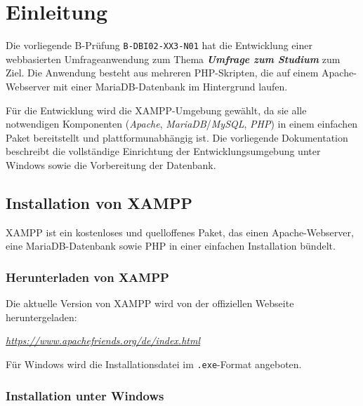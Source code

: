 
\chapter{Einleitung}
\label{chap:einleitung}
\thispagestyle{fancy}

Die vorliegende B-Prüfung \texttt{B-DBI02-XX3-N01} hat die Entwicklung einer webbasierten Umfrageanwendung zum Thema \glqq{}\textbf{\textit{Umfrage zum Studium}}\grqq{} zum Ziel. Die Anwendung besteht aus mehreren \acs{PHP}-Skripten, die auf einem Apache-Webserver mit einer Maria\acs{DB}-Datenbank im Hintergrund laufen.

Für die Entwicklung wird die \acs{XAMPP}-Umgebung gewählt, da sie alle notwendigen Komponenten (\textit{Apache}, \textit{Maria\acs{DB}}/\textit{My\acs{SQL}}, \textit{\acs{PHP}}) in einem einfachen Paket bereitstellt und plattformunabhängig ist. Die vorliegende Dokumentation beschreibt die vollständige Einrichtung der Entwicklungsumgebung unter Windows sowie die Vorbereitung der Datenbank.

\section{Installation von \acs{XAMPP}}

\acs{XAMPP} ist ein kostenloses und quelloffenes Paket, das einen Apache-Webserver, eine Maria\acs{DB}-Datenbank sowie \acs{PHP} in einer einfachen Installation bündelt.

\subsection{Herunterladen von \acs{XAMPP}}

Die aktuelle Version von \acs{XAMPP} wird von der offiziellen Webseite heruntergeladen:

\begin{center}
    \textsl{\url{https://www.apachefriends.org/de/index.html}}
\end{center}

Für Windows wird die Installationsdatei im \texttt{.exe}-Format angeboten.

\subsection{Installation unter Windows}

